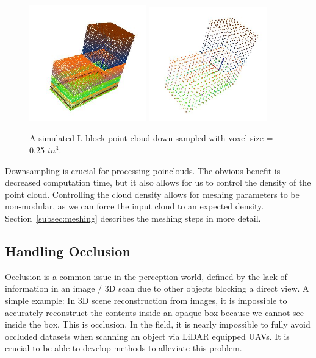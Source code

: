 \documentclass[12pt]{drexelthesis}
\let\Oldsubsection\subsection
\renewcommand{\subsection}{\FloatBarrier\Oldsubsection}
\begin{document}
\begin{figure}[!ht]
	\centering
		\includegraphics[width=2in]{l_block_pt_cloud} \includegraphics[width=2in]{l_block_pt_cloudDOWNSAMPLE025.jpg}
	\caption[Effects of down-sampling on simulated point cloud objects]{\centering A simulated L block point cloud down-sampled with voxel size = 0.25 $in^{3}$.}
	\label{intro:downsampling}
\end{figure}

Downsampling is crucial for processing poinclouds. The obvious benefit is decreased computation time, but it also allows for us to control the density of the point cloud. Controlling the cloud density allows for meshing parameters to be non-modular, as we can force the input cloud to an expected density. Section~\ref{subsec:meshing} describes the meshing steps in more detail.

\subsection{Handling Occlusion} 
Occlusion is a common issue in the perception world, defined by the lack of information in an image / 3D scan due to other objects blocking a direct view. A simple example: In 3D scene reconstruction from images, it is impossible to accurately reconstruct the contents inside an opaque box because we cannot see inside the box. This is occlusion. In the field, it is nearly impossible to fully avoid occluded datasets when scanning an object via LiDAR equipped UAVs. It is crucial to be able to develop methods to alleviate this problem.
\end{document}
